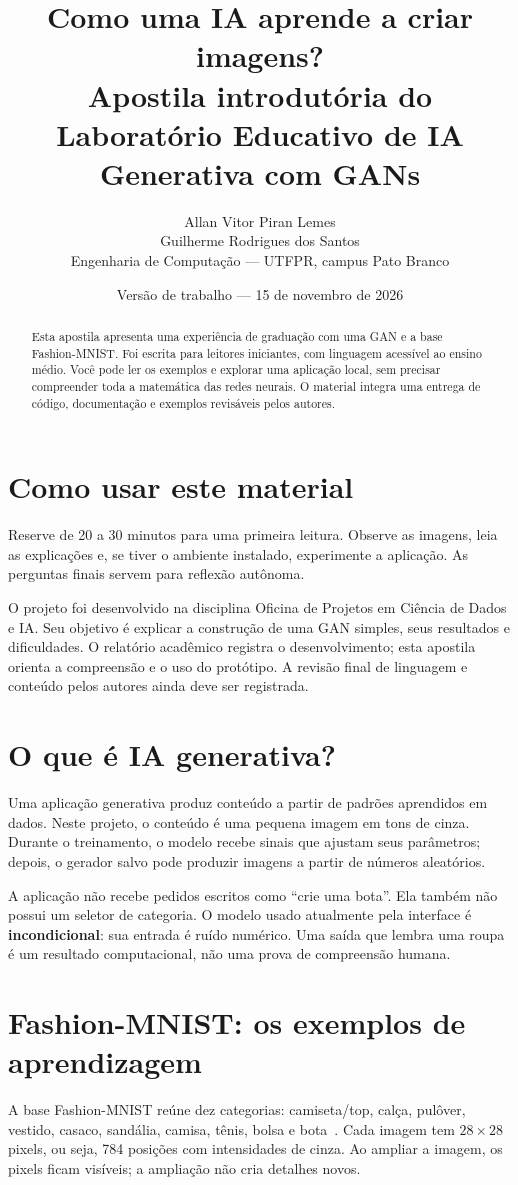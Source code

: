 \documentclass[12pt,a4paper]{article}
\title{Como uma IA aprende a criar imagens?\\\large Apostila introdutória do Laboratório Educativo de IA Generativa com GANs}
\author{Allan Vitor Piran Lemes\\Guilherme Rodrigues dos Santos\\\small Engenharia de Computação --- UTFPR, campus Pato Branco}
\date{Versão de trabalho --- 15 de novembro de 2026}
\begin{document}
\maketitle
\begin{abstract}
Esta apostila apresenta uma experiência de graduação com uma GAN e a base Fashion-MNIST. Foi escrita para leitores iniciantes, com linguagem acessível ao ensino médio. Você pode ler os exemplos e explorar uma aplicação local, sem precisar compreender toda a matemática das redes neurais. O material integra uma entrega de código, documentação e exemplos revisáveis pelos autores.
\end{abstract}
\tableofcontents
\clearpage

\section{Como usar este material}
Reserve de 20 a 30 minutos para uma primeira leitura. Observe as imagens, leia as explicações e, se tiver o ambiente instalado, experimente a aplicação. As perguntas finais servem para reflexão autônoma.

O projeto foi desenvolvido na disciplina Oficina de Projetos em Ciência de Dados e IA. Seu objetivo é explicar a construção de uma GAN simples, seus resultados e dificuldades. O relatório acadêmico registra o desenvolvimento; esta apostila orienta a compreensão e o uso do protótipo. A revisão final de linguagem e conteúdo pelos autores ainda deve ser registrada.

\section{O que é IA generativa?}
Uma aplicação generativa produz conteúdo a partir de padrões aprendidos em dados. Neste projeto, o conteúdo é uma pequena imagem em tons de cinza. Durante o treinamento, o modelo recebe sinais que ajustam seus parâmetros; depois, o gerador salvo pode produzir imagens a partir de números aleatórios.

A aplicação não recebe pedidos escritos como ``crie uma bota''. Ela também não possui um seletor de categoria. O modelo usado atualmente pela interface é \textbf{incondicional}: sua entrada é ruído numérico. Uma saída que lembra uma roupa é um resultado computacional, não uma prova de compreensão humana.

\section{Fashion-MNIST: os exemplos de aprendizagem}
A base Fashion-MNIST reúne dez categorias: camiseta/top, calça, pulôver, vestido, casaco, sandália, camisa, tênis, bolsa e bota~\cite{fashion}. Cada imagem tem $28\times28$ pixels, ou seja, 784 posições com intensidades de cinza. Ao ampliar a imagem, os pixels ficam visíveis; a ampliação não cria detalhes novos.
\end{document}
